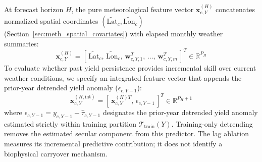 At forecast horizon $H$, the pure meteorological feature vector $\mathbf{x}_{c,Y}^{(H)}$ concatenates normalized spatial coordinates $(\tilde{\text{Lat}}_c, \tilde{\text{Lon}}_c)$ (Section~\ref{sec:meth_spatial_covariates}) with elapsed monthly weather summaries:
\begin{equation}
    \mathbf{x}_{c,Y}^{(H)} = \left[ \, \tilde{\text{Lat}}_c, \, \tilde{\text{Lon}}_c, \, \mathbf{w}_{c,Y, 1}^T, \, \dots, \, \mathbf{w}_{c,Y, m}^T \, \right]^T \in \mathbb{R}^{P_H}
    \label{eq:tabular_feature_vector}
\end{equation}
To evaluate whether past yield persistence provides incremental skill over current weather conditions, we specify an integrated feature vector that appends the prior-year detrended yield anomaly ($\epsilon_{c,Y-1}$):
\begin{equation}
    \mathbf{x}_{c,Y}^{(H, \text{int})} = \left[ \, \mathbf{x}_{c,Y}^{(H)T}, \, \epsilon_{c, Y-1} \, \right]^T \in \mathbb{R}^{P_H + 1}
    \label{eq:integrated_feature_vector}
\end{equation}
where $\epsilon_{c, Y-1} = y_{c, Y-1} - \hat{\tau}_{c, Y-1}$ designates the prior-year detrended yield anomaly estimated strictly within training partition $\mathcal{T}_{\text{train}}(Y)$. Training-only detrending removes the estimated secular component from this predictor. The lag ablation measures its incremental predictive contribution; it does not identify a biophysical carryover mechanism.

